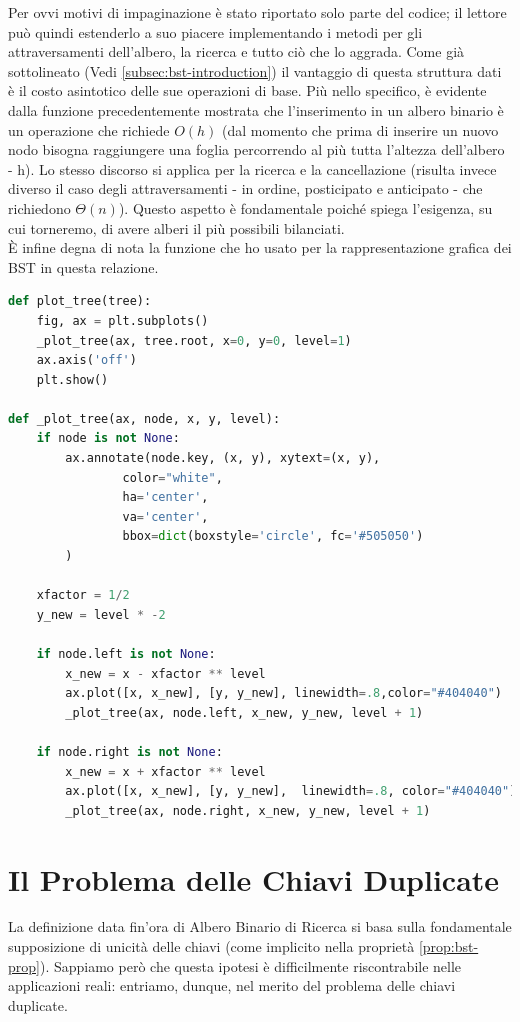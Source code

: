 \documentclass{article}
\begin{document}
Per ovvi motivi di impaginazione è stato riportato solo parte del codice; il lettore può quindi estenderlo a suo piacere implementando i metodi per gli attraversamenti dell'albero, la ricerca e tutto ciò che lo aggrada.
Come già sottolineato (Vedi \ref{subsec:bst-introduction}) il vantaggio di questa struttura dati è il costo asintotico delle sue operazioni di base. Più nello specifico, è evidente dalla funzione precedentemente mostrata che l'inserimento in un albero binario è un operazione che richiede $O(h)$ (dal momento che prima di inserire un nuovo nodo bisogna raggiungere una foglia percorrendo al più tutta l'altezza dell'albero - h). Lo stesso discorso si applica per la ricerca e la cancellazione (risulta invece diverso il caso degli attraversamenti - in ordine, posticipato e anticipato - che richiedono $\Theta(n)$).
Questo aspetto è fondamentale poiché spiega l'esigenza, su cui torneremo, di avere alberi il più possibili bilanciati. \\
È infine degna di nota la funzione che ho usato per la rappresentazione grafica dei BST in questa relazione.

\begin{lstlisting}[language=Python, caption={Rappresentazione Grafica di un BST}, label={lst:plot_tree}]
def plot_tree(tree):
    fig, ax = plt.subplots()
    _plot_tree(ax, tree.root, x=0, y=0, level=1)
    ax.axis('off')
    plt.show()

def _plot_tree(ax, node, x, y, level):
    if node is not None:
        ax.annotate(node.key, (x, y), xytext=(x, y),
                color="white",    
                ha='center',
                va='center', 
                bbox=dict(boxstyle='circle', fc='#505050')
        )

    xfactor = 1/2
    y_new = level * -2

    if node.left is not None:
        x_new = x - xfactor ** level
        ax.plot([x, x_new], [y, y_new], linewidth=.8,color="#404040")
        _plot_tree(ax, node.left, x_new, y_new, level + 1)

    if node.right is not None:
        x_new = x + xfactor ** level
        ax.plot([x, x_new], [y, y_new],  linewidth=.8, color="#404040")
        _plot_tree(ax, node.right, x_new, y_new, level + 1)
\end{lstlisting}


\section{Il Problema delle Chiavi Duplicate}
\label{sec:dup-section}
La definizione data fin'ora di Albero Binario di Ricerca si basa sulla fondamentale supposizione di unicità delle chiavi
(come implicito nella proprietà \ref{prop:bst-prop}).
Sappiamo però che questa ipotesi è difficilmente riscontrabile nelle applicazioni reali:
entriamo, dunque, nel merito del problema delle chiavi duplicate.
\end{document}
